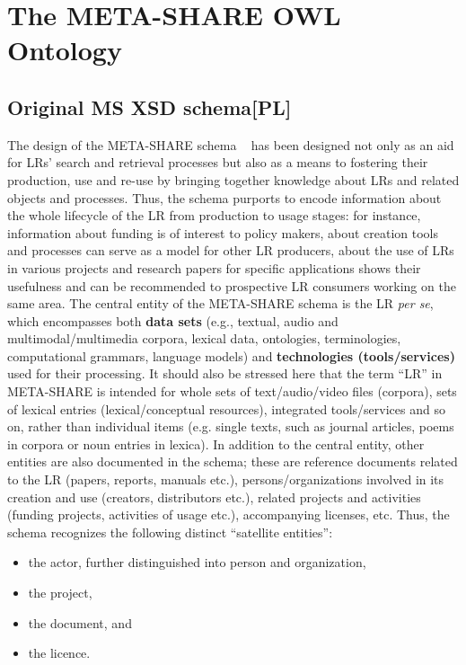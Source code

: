 \documentclass{llncs}
\begin{document}
\section{The META-SHARE OWL Ontology}
\label{sec:ontology}

\subsection{Original MS XSD schema[PL]}
\label{sec:xsd}

The design of the META-SHARE schema ~\cite{gavrilidou2012metashare} has been %
designed not only as an aid for LRs' search and retrieval processes but also as a means to fostering their production, use and re-use by bringing together knowledge about LRs and related objects and processes. Thus, the schema purports to encode information about the whole lifecycle of the LR from production to usage stages: for instance, information about funding is of interest to policy makers, about creation tools and processes can serve as a model for other LR producers, about the use of LRs in various projects and research papers for specific applications shows their usefulness and can be recommended to prospective LR consumers working on the same area.
The central entity of the META-SHARE schema is the LR \textit{per se}, which encompasses
both {\bf data sets} (e.g., textual, audio and multimodal/multimedia corpora, lexical
data, ontologies, terminologies, computational grammars, language models)
and {\bf technologies (tools/services)} used for their processing. It should
also be stressed here that the term ``LR'' in META-SHARE is intended for whole sets of text/audio/video files (corpora), sets of lexical entries (lexical/conceptual resources), integrated tools/services and so on, rather than individual items (e.g. single texts, such as journal articles, poems in corpora or noun entries in lexica).
In addition to the central entity, other entities are also documented in the
schema; these are reference documents related to the LR (papers, reports,
manuals etc.), persons/organizations involved in its creation and use (creators,
distributors etc.), related projects and activities (funding projects,
activities of usage etc.), accompanying licenses, etc. Thus, the schema
recognizes the following distinct ``satellite entities'':
\begin{itemize}
\item the actor, further distinguished into person and organization,
\item the project,
\item the document, and
\item the licence.
\end{itemize}
\end{document}
